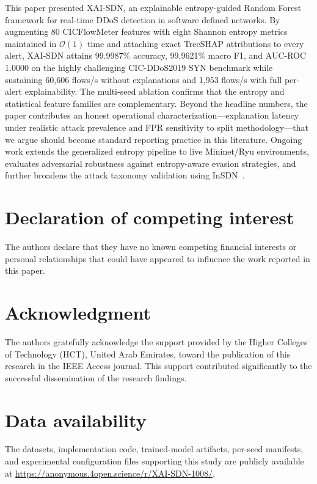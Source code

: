 \documentclass{ieeeaccess}
\begin{document}
This paper presented XAI-SDN, an explainable entropy-guided Random Forest framework for real-time DDoS detection in software defined networks. By augmenting 80 CICFlowMeter features with eight Shannon entropy metrics maintained in $\mathcal{O}(1)$ time and attaching exact TreeSHAP attributions to every alert, XAI-SDN attains 99.9987\% accuracy, 99.9621\% macro F1, and AUC-ROC 1.0000 on the highly challenging CIC-DDoS2019 SYN benchmark while sustaining 60,606 flows/s without explanations and 1,953 flows/s with full per-alert explainability. The multi-seed ablation confirms that the entropy and statistical feature families are complementary. Beyond the headline numbers, the paper contributes an honest operational characterization---explanation latency under realistic attack prevalence and FPR sensitivity to split methodology---that we argue should become standard reporting practice in this literature. Ongoing work extends the generalized entropy pipeline to live Mininet/Ryu environments, evaluates adversarial robustness against entropy-aware evasion strategies, and further broadens the attack taxonomy validation using InSDN~\cite{elsayed2020insdn}.

\section*{Declaration of competing interest}
The authors declare that they have no known competing financial interests or personal relationships that could have appeared to influence the work reported in this paper.

\section*{Acknowledgment}
The authors gratefully acknowledge the support provided by the Higher Colleges of Technology (HCT), United Arab Emirates, toward the publication of this research in the IEEE Access journal. This support contributed significantly to the successful dissemination of the research findings.

\section*{Data availability}
The datasets, implementation code, trained-model artifacts, per-seed manifests, and experimental configuration files supporting this study are publicly available at \url{https://anonymous.4open.science/r/XAI-SDN-1008/}.



\end{document}
